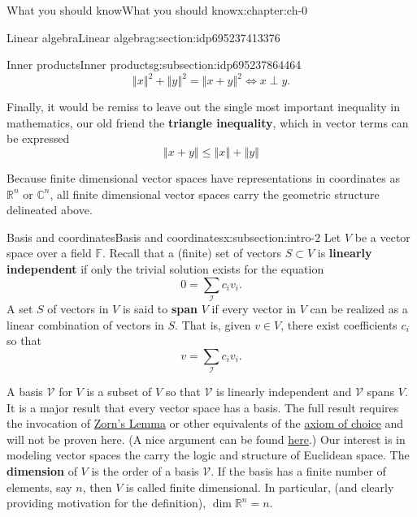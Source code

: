 \documentclass[oneside,10pt,]{book}
\newcommand{\terminology}[1]{\textbf{#1}}
\numberwithin{equation}{section}
\newcommand{\F}{\mathbb{F}}
\newcommand{\C}{\mathbb{C}}
\newcommand{\R}{\mathbb{R}}
\newcommand{\norm}[1]{\left\Vert#1\right\Vert}
\numberwithin{equation}{section}
\begin{document}
\begin{chapterptx}{What you should know}{}{What you should know}{}{}{x:chapter:ch-0}
\begin{sectionptx}{Linear algebra}{}{Linear algebra}{}{}{g:section:idp695237413376}
\begin{subsectionptx}{Inner products}{}{Inner products}{}{}{g:subsection:idp695237864464}
\begin{equation}
\norm{x}^2 + \norm{y}^2 = \norm{x+ y}^2 \iff x\perp y.\label{g:men:idp695237879136}
\end{equation}
%
\par
Finally, it would be remiss to leave out the single most important inequality in mathematics, our old friend the \terminology{triangle inequality}, which in vector terms can be expressed%
\begin{equation}
\norm{x + y} \leq \norm{x} + \norm{y}\label{g:men:idp695237880288}
\end{equation}
%
\par
Because finite dimensional vector spaces have representations in coordinates as \(\R^n\) or \(\C^n\), all finite dimensional vector spaces carry the geometric structure delineated above.%
\end{subsectionptx}
%
%
\typeout{************************************************}
\typeout{************************************************}
%
\begin{subsectionptx}{Basis and coordinates}{}{Basis and coordinates}{}{}{x:subsection:intro-2}
Let \(V\) be a vector space over a field \(\F\). Recall that a (finite) set of vectors \(S \subset V\) is \terminology{linearly independent} if only the trivial solution exists for the equation%
\begin{equation}
0 = \sum_\mathcal{I} c_i v_i.\label{g:men:idp695237885072}
\end{equation}
A set \(S\) of vectors in \(V\) is said to \terminology{span} \(V\) if every vector in \(V\) can be realized as a linear combination of vectors in \(S\). That is, given \(v \in V\), there exist coefficients \(c_i\) so that%
\begin{equation*}
v = \sum_{\mathcal I} c_i v_i.
\end{equation*}
%
\par
A basis \(\mathcal V\) for \(V\) is a subset of \(V\) so that \(\mathcal V\) is linearly independent and \(\mathcal V\) spans \(V\). It is a major result that every vector space has a basis. The full result requires the invocation of \href{https://en.wikipedia.org/wiki/Zorn\%27s_lemma}{Zorn's Lemma} or other equivalents of the \href{https://en.wikipedia.org/wiki/Axiom_of_choice}{axiom of choice} and will not be proven here. (A nice argument can be found \href{http://www.math.lsa.umich.edu/\~kesmith/infinite.pdf}{here}.) Our interest is in modeling vector spaces the carry the logic and structure of Euclidean space. The \terminology{dimension} of \(V\) is the order of a basis \(\mathcal V\). If the basis has a finite number of elements, say \(n\), then \(V\) is called finite dimensional. In particular, (and clearly providing motivation for the definition), \(\dim \R^n = n\).%

\end{subsectionptx}
\end{sectionptx}
\end{chapterptx}
\end{document}
